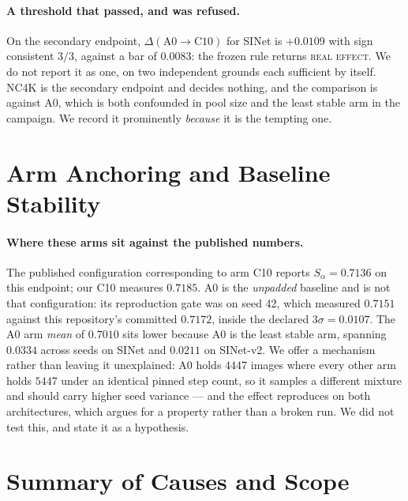 \documentclass{article} %
\begin{document}
\paragraph{A threshold that passed, and was refused.} On the secondary endpoint,
$\Delta(\mathrm{A0} \rightarrow \mathrm{C10})$ for SINet is $+0.0109$ with sign consistent $3/3$,
against a bar of $0.0083$: the frozen rule returns \textsc{real effect}. We do not report it as
one, on two independent grounds each sufficient by itself. NC4K is the secondary endpoint and decides
nothing, and the comparison is against A0, which is both confounded in pool size and the least
stable arm in the campaign. We record it prominently \emph{because} it is the tempting one.


\section{Arm Anchoring and Baseline Stability}
\label{app:anchor}

\paragraph{Where these arms sit against the published numbers.} The published configuration
corresponding to arm C10 reports $S_\alpha = 0.7136$ on this endpoint; our C10 measures $0.7185$. A0
is the \emph{unpadded} baseline and is not that configuration: its reproduction gate was on seed 42, which measured $0.7151$ against this repository's committed $0.7172$, inside the declared
$3\sigma = 0.0107$. The A0 arm \emph{mean} of $0.7010$ sits lower because A0 is the least stable arm,
spanning $0.0334$ across seeds on SINet and $0.0211$ on SINet-v2. We offer a mechanism rather than
leaving it unexplained: A0 holds $4447$ images where every other arm holds $5447$ under an identical
pinned step count, so it samples a different mixture and should carry higher seed variance --- and the
effect reproduces on both architectures, which argues for a property rather than a broken run. We did
not test this, and state it as a hypothesis.


\section{Summary of Causes and Scope}
\label{app:causes}
\end{document}
